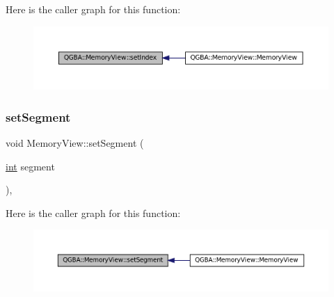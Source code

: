 Here is the caller graph for this function\+:
\nopagebreak
\begin{figure}[H]
\begin{center}
\leavevmode
\includegraphics[width=350pt]{class_q_g_b_a_1_1_memory_view_a1006e186a3bd5335c02a59795713b2df_icgraph}
\end{center}
\end{figure}
\mbox{\label{class_q_g_b_a_1_1_memory_view_a0f43bc37a3fcabae7882b24dd5a7023e}} 
\subsubsection{\texorpdfstring{set\+Segment}{setSegment}}
{\footnotesize\ttfamily void Memory\+View\+::set\+Segment (\begin{DoxyParamCaption}\item[{\mbox{\hyperlink{ioapi_8h_a787fa3cf048117ba7123753c1e74fcd6}{int}}}]{segment }\end{DoxyParamCaption})\hspace{0.3cm}{\ttfamily [private]}, {\ttfamily [slot]}}

Here is the caller graph for this function\+:
\nopagebreak
\begin{figure}[H]
\begin{center}
\leavevmode
\includegraphics[width=350pt]{class_q_g_b_a_1_1_memory_view_a0f43bc37a3fcabae7882b24dd5a7023e_icgraph}
\end{center}
\end{figure}
\mbox{\label{class_q_g_b_a_1_1_memory_view_a7f782144cc93b71df28e9806c0c91ee8}} 
